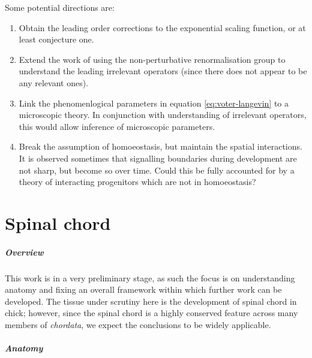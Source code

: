 \documentclass[10pt,english]{report}
\begin{document}
Some potential directions are:

\begin{enumerate}

\item Obtain the leading order corrections to the exponential scaling function, or at least conjecture one.

\item Extend the work of \citet{canet05} using the non-perturbative renormalisation group to understand the leading irrelevant operators (since there does not appear to be any relevant ones).

\item Link the phenomenlogical parameters in equation \eqref{eq:voter-langevin} to a microscopic theory. In conjunction with understanding of irrelevant operators, this would allow inference of microscopic parameters.

\item Break the assumption of homoeostasis, but maintain the spatial interactions. It is observed sometimes that signalling boundaries during development are not sharp, but become so over time. Could this be fully accounted for by a theory of interacting progenitors which are not in homoeostasis?

\end{enumerate}

\chapter{Spinal chord}

\paragraph{Overview}

This work is in a very preliminary stage, as such the focus is on understanding anatomy and fixing an overall framework within which further work can be developed. The tissue under scrutiny here is the development of spinal chord in chick; however, since the spinal chord is a highly conserved feature across many members of \emph{chordata}, we expect the conclusions to be widely applicable.

\paragraph{Anatomy}
\end{document}
